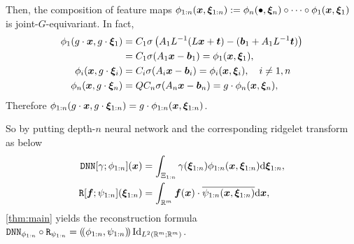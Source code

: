 Then, the composition of feature maps $\phi_{1:n}(\bm{x},\bm{\xi}_{1:n}) := \phi_n(\bullet, \bm{\xi}_n) \circ \cdots \circ \phi_1(\bm{x},\bm{\xi}_1)$ is joint-$G$-equivariant. In fact,
	\begin{align*}
		\phi_1( g \cdot \bm{x}, g \cdot \bm{\xi}_1 )
		&= C_1\sigma\left( A_1L^{-1} (L\bm{x}+\bm{t}) - (\bm{b}_1 + A_1L^{-1}\bm{t})\right)\\
        &= C_1\sigma(A_1\bm{x}-\bm{b}_1)
		= \phi_1( \bm{x}, \bm{\xi}_1 ),\\
		\phi_i( \bm{x}, g \cdot \bm{\xi}_i )
        &= C_i\sigma(A_i\bm{x}-\bm{b}_i)
		= \phi_i( \bm{x}, \bm{\xi}_i ), \quad i \neq 1,n\\
		\phi_n( \bm{x}, g \cdot \bm{\xi}_n )
        &= Q C_n\sigma(A_n\bm{x}-\bm{b}_n)
		= g \cdot \phi_n( \bm{x}, \bm{\xi}_n ),
	\end{align*}
Therefore $\phi_{1:n}( g \cdot \bm{x}, g \cdot \bm{\xi}_{1:n} )=g \cdot \phi_{1:n}( \bm{x}, \bm{\xi}_{1:n} )$.

So by putting depth-$n$ neural network and the corresponding ridgelet transform as below
	\begin{align*}
		\dnn[\gamma;\phi_{1:n}](\xx) &= \int_{\Xi_{1:n}} \gamma(\xxi_{1:n}) \phi_{1:n}(\xx,\xxi_{1:n}) \dd \xxi_{1:n}, \\%
		\ridge[\ff;\psi_{1:n}](\xxi_{1:n}) &= \int_{\RR^m} \ff(\xx) \cdot \overline{\psi_{1:n}(\xx,\xxi_{1:n})}\dd\xx, %
	\end{align*}
\cref{thm:main} yields the reconstruction formula $\mathtt{DNN}_{\phi_{1:n}} \circ \mathtt{R}_{\psi_{1:n}} = (\!(\phi_{1:n},\psi_{1:n})\!) \operatorname{Id}_{L^2(\mathbb{R}^m;\mathbb{R}^m)}$.

